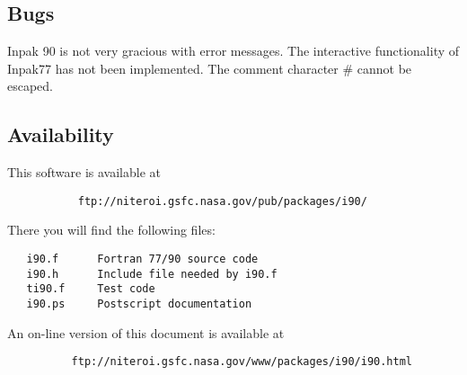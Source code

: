 \subsection{Bugs} 
         Inpak 90 is not very gracious with error messages.  
         The interactive functionality of Inpak77 has not been implemented.
         The comment character \# cannot be escaped.
  
\subsection{Availability}
%  
This software is available at 
   \begin{verbatim}
           ftp://niteroi.gsfc.nasa.gov/pub/packages/i90/ 
   \end{verbatim}
     There you will find the following files:
   \begin{verbatim}
   i90.f      Fortran 77/90 source code
   i90.h      Include file needed by i90.f
   ti90.f     Test code
   i90.ps     Postscript documentation
   \end{verbatim}
   An on-line version of this document is available at
   \begin{verbatim}
          ftp://niteroi.gsfc.nasa.gov/www/packages/i90/i90.html
   \end{verbatim}   
%
\nopagebreak
